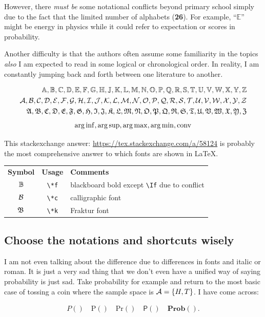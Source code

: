 \documentclass[aos,preprint]{imsart}
\begin{document}
However, there \textit{must be} some notational conflicts beyond primary school
simply due to the fact that the limited number of alphabets (\textbf{26}).
For example, ``$\mathbb{E}$'' might be energy in physics
while it could refer to expectation or scores in probability.

Another difficulty is that the authors often assume some familiarity in the
topics
\emph{also} I am expected to read in some logical or chronological order.
In reality, I am constantly jumping back and forth between one literature to
another.

\begin{align*}
	\Af, \Bf, \Cf, \Df, \Ef, \Ff, \Gf, \Hf, \Jf, \Kf, \Lf, \Mf, \Nf, \Of, \Pf,
	\Qf, \Rf, \Sf, \Tf, \Uf, \Vf, \Wf, \Xf, \Yf, \Zf      \\
	\Ac, \Bc, \Cc, \Dc, \Ec, \Fc, \Gc, \Hc, \Ic, \Jc, \Kc, \Lc, \Mc, \Nc, \Oc,
	\Pc, \Qc, \Rc, \Sc, \Tc, \Uc, \Vc, \Wc, \Xc, \Yc, \Zc \\
	\Ak, \Bk, \Ck, \Dk, \Ek, \Fk, \Gk, \Hk, \Ik, \Jk, \Kk, \Lk, \Mk, \Nk, \Ok,
	\Pk, \Qk, \Rk, \Sk, \Tk, \Uk, \Vk, \Wk, \Xk, \Yk, \Zk
\end{align*}
$$
	\operatorname*{arg\, inf}, \operatorname*{arg\, sup}, \operatorname*{arg\, max}, \operatorname*{arg\, min}, \mathrm{conv}
$$

This stackexchange answer: \url{https://tex.stackexchange.com/a/58124}
is probably the most comprehensive answer to which fonts are shown in \LaTeX.

\begin{tabular}{ccl}
	\textbf{Symbol} & \textbf{Usage} & \textbf{Comments}                                 \\
	$\mathbb{B}$           & \verb|\*f|     & blackboard bold except \verb|\If| due to conflict \\
	$\mathcal{B}$           & \verb|\*c|     & calligraphic font                                 \\
	$\mathfrak{B}$           & \verb|\*k|     & Fraktur font                                      \\
\end{tabular}

\subsection{Choose the notations and shortcuts wisely}

I am not even talking about the difference due to differences in fonts and italic or roman.
It is just a very sad thing that we don't even have a unified way of saying probability is just sad.
Take probability for example and return to the most basic case of tossing a
coin
where the sample space is $\mathcal{A} = \{H, T\}$. I have come across:

\begin{align*}
	P() \quad \mathrm{P}() \quad \mathrm{Pr}() \quad \mathsf{P}() \quad
	\mathbf{Prob}().
\end{align*}
\end{document}
